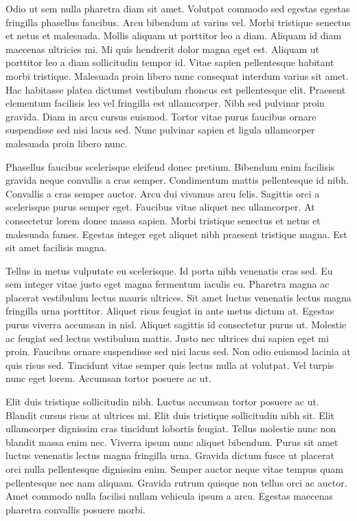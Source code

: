 \documentclass[11pt,a4paper]{article}
\begin{document}
Odio ut sem nulla pharetra diam sit amet. Volutpat commodo sed egestas egestas fringilla phasellus faucibus. Arcu bibendum at varius vel. Morbi tristique senectus et netus et malesuada. Mollis aliquam ut porttitor leo a diam. Aliquam id diam maecenas ultricies mi. Mi quis hendrerit dolor magna eget est. Aliquam ut porttitor leo a diam sollicitudin tempor id. Vitae sapien pellentesque habitant morbi tristique. Malesuada proin libero nunc consequat interdum varius sit amet. Hac habitasse platea dictumst vestibulum rhoncus est pellentesque elit. Praesent elementum facilisis leo vel fringilla est ullamcorper. Nibh sed pulvinar proin gravida. Diam in arcu cursus euismod. Tortor vitae purus faucibus ornare suspendisse sed nisi lacus sed. Nunc pulvinar sapien et ligula ullamcorper malesuada proin libero nunc.

Phasellus faucibus scelerisque eleifend donec pretium. Bibendum enim facilisis gravida neque convallis a cras semper. Condimentum mattis pellentesque id nibh. Convallis a cras semper auctor. Arcu dui vivamus arcu felis. Sagittis orci a scelerisque purus semper eget. Faucibus vitae aliquet nec ullamcorper. At consectetur lorem donec massa sapien. Morbi tristique senectus et netus et malesuada fames. Egestas integer eget aliquet nibh praesent tristique magna. Est sit amet facilisis magna.

Tellus in metus vulputate eu scelerisque. Id porta nibh venenatis cras sed. Eu sem integer vitae justo eget magna fermentum iaculis eu. Pharetra magna ac placerat vestibulum lectus mauris ultrices. Sit amet luctus venenatis lectus magna fringilla urna porttitor. Aliquet risus feugiat in ante metus dictum at. Egestas purus viverra accumsan in nisl. Aliquet sagittis id consectetur purus ut. Molestie ac feugiat sed lectus vestibulum mattis. Justo nec ultrices dui sapien eget mi proin. Faucibus ornare suspendisse sed nisi lacus sed. Non odio euismod lacinia at quis risus sed. Tincidunt vitae semper quis lectus nulla at volutpat. Vel turpis nunc eget lorem. Accumsan tortor posuere ac ut.

Elit duis tristique sollicitudin nibh. Luctus accumsan tortor posuere ac ut. Blandit cursus risus at ultrices mi. Elit duis tristique sollicitudin nibh sit. Elit ullamcorper dignissim cras tincidunt lobortis feugiat. Tellus molestie nunc non blandit massa enim nec. Viverra ipsum nunc aliquet bibendum. Purus sit amet luctus venenatis lectus magna fringilla urna. Gravida dictum fusce ut placerat orci nulla pellentesque dignissim enim. Semper auctor neque vitae tempus quam pellentesque nec nam aliquam. Gravida rutrum quisque non tellus orci ac auctor. Amet commodo nulla facilisi nullam vehicula ipsum a arcu. Egestas maecenas pharetra convallis posuere morbi.
\end{document}
